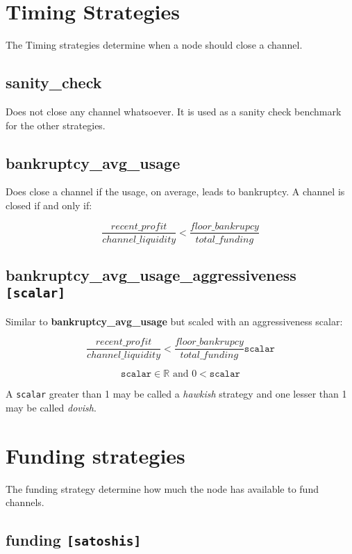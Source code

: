 \section*{Timing Strategies}
The Timing strategies determine when a node should close a channel.

\subsection*{sanity\_check}

Does not close any channel whatsoever. It is used as a sanity check benchmark for the other strategies.

\subsection*{bankruptcy\_avg\_usage}

Does close a channel if the usage, on average, leads to bankruptcy. A channel is closed if and only if:

\[ \frac{recent\_profit}{channel\_liquidity} < \frac{floor\_bankrupcy}{total\_funding} \]
 
\subsection*{bankruptcy\_avg\_usage\_aggressiveness \texttt{[scalar]}}

Similar to \textbf{bankruptcy\_avg\_usage} but scaled with an aggressiveness scalar:

\[ \frac{recent\_profit}{channel\_liquidity} < \frac{floor\_bankrupcy}{total\_funding} \texttt{scalar} \]

\[ \texttt{scalar} \in \mathbb{R} \text{ and } 0 < \texttt{scalar}  \]

A \texttt{scalar} greater than 1 may be called a \textit{hawkish} strategy and one lesser than 1 may be called \textit{dovish}.

\section*{Funding strategies}

The funding strategy determine how much the node has available to fund channels.

\subsection*{funding \texttt{[satoshis]}}

